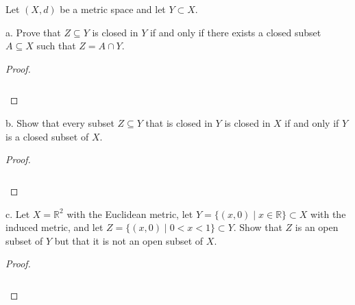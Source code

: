 Let $(X, d)$ be a metric space and let $Y \subset X$.

a.  Prove that $Z \subseteq Y$ is closed in $Y$ if and only if there exists a closed subset $A \subseteq X$ such that 
    $Z = A \cap Y$. 

\begin{proof}\renewcommand{\qedsymbol}{}\ \\\\
    \begin{align*}
    \end{align*}
\end{proof}

\pagebreak

b.  Show that every subset $Z \subseteq Y$ that is closed in $Y$ is closed in $X$ if and only if $Y$ is a closed subset
    of $X$.

\begin{proof}\renewcommand{\qedsymbol}{}\ \\\\
    \begin{align*}
    \end{align*}
\end{proof}

\pagebreak

c.  Let $X = \mathbb{R}^2$ with the Euclidean metric, let $Y = \{(x, 0) \mid x \in \mathbb{R} \} \subset X$ with the
    induced metric, and let $Z = \{(x, 0) \mid 0 < x < 1 \} \subset Y$. Show that $Z$ is an open subset of $Y$ but that
    it is not an open subset of $X$.

\begin{proof}\renewcommand{\qedsymbol}{}\ \\\\
    \begin{align*}
    \end{align*}
\end{proof}

\pagebreak